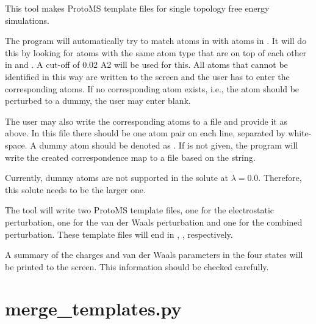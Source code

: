 \documentclass[letterpaper,10pt,english]{sphinxmanual}
\begin{document}

This tool makes ProtoMS template files for single topology free energy simulations.

The program will automatically try to match atoms in  with atoms in . It will do this by looking for atoms with the same atom type that are on top of each other in  and . A cut-off of 0.02 A2 will be used for this. All atoms that cannot be identified in this way are written to the screen and the user has to enter the corresponding atoms. If no corresponding atom exists, i.e., the atom should be perturbed to a dummy, the user may enter blank.

The user may also write the corresponding atoms to a file and provide it as  above. In this file there should be one atom pair on each line, separated by white-space. A dummy atom should be denoted as . If  is not given, the program will write the created correspondence map to a file based on the  string.

Currently, dummy atoms are not supported in the solute at \(\lambda=0.0\). Therefore, this solute needs to be the larger one.

The tool will write two ProtoMS template files, one for the electrostatic perturbation, one for the van der Waals perturbation and one for the combined perturbation. These template files will end in , ,  respectively.

A summary of the charges and van der Waals parameters in the four states will be printed to the screen. This information should be checked carefully.


\section{merge\_templates.py}
\label{\detokenize{tools:merge-templates-py}}

%
\begin{sphinxVerbatim}[commandchars=\\\{\}]
     
\end{sphinxVerbatim}
\end{document}
